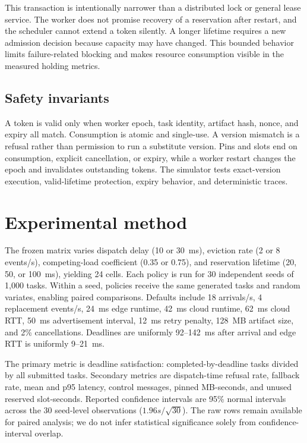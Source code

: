\documentclass[conference]{IEEEtran}
\begin{document}
This transaction is intentionally narrower than a distributed lock or general
lease service. The worker does not promise recovery of a reservation after restart,
and the scheduler cannot extend a token silently. A longer lifetime requires a new
admission decision because capacity may have changed. This bounded behavior limits
failure-related blocking and makes resource consumption visible in the measured
holding metrics.

\subsection{Safety invariants}

A token is valid only when worker epoch, task identity, artifact hash, nonce, and
expiry all match. Consumption is atomic and single-use. A version mismatch is a
refusal rather than permission to run a substitute version. Pins and slots end on
consumption, explicit cancellation, or expiry, while a worker restart changes the
epoch and invalidates outstanding tokens. The simulator tests exact-version
execution, valid-lifetime protection, expiry behavior, and deterministic traces.

\section{Experimental method}

The frozen matrix varies dispatch delay (10 or 30~ms), eviction rate (2 or 8 events/s), competing-load coefficient (0.35 or 0.75), and reservation lifetime (20, 50, or 100~ms), yielding 24 cells. Each policy is run for 30 independent seeds of 1,000 tasks. Within a seed, policies receive the same generated tasks and random variates, enabling paired comparisons. Defaults include 18 arrivals/s, 4 replacement events/s, 24~ms edge runtime, 42~ms cloud runtime, 62~ms cloud RTT, 50~ms advertisement interval, 12~ms retry penalty, 128~MB artifact size, and 2\% cancellations. Deadlines are uniformly 92--142~ms after arrival and edge RTT is uniformly 9--21~ms.

The primary metric is deadline satisfaction: completed-by-deadline tasks divided by all submitted tasks. Secondary metrics are dispatch-time refusal rate, fallback rate, mean and p95 latency, control messages, pinned MB-seconds, and unused reserved slot-seconds. Reported confidence intervals are 95\% normal intervals across the 30 seed-level observations ($1.96s/\sqrt{30}$). The raw rows remain available for paired analysis; we do not infer statistical significance solely from confidence-interval overlap.
\end{document}
